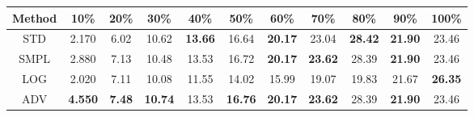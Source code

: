 \documentclass{standalone}
\begin{document}
\begin{tabular}{c|cccccccccc}
      \toprule
      Method & 10\% & 20\% & 30\% & 40\% & 50\% & 60\% & 70\% & 80\% & 90\% & 100\% \\
      \midrule
STD & 2.170 & 6.02 & 10.62 & \textbf{13.66} & 16.64 & \textbf{20.17} & 23.04 & \textbf{28.42} & \textbf{21.90} & 23.46\\
SMPL & 2.880 & 7.13 & 10.48 & 13.53 & 16.72 & \textbf{20.17} & \textbf{23.62} & 28.39 & \textbf{21.90} & 23.46\\
LOG & 2.020 & 7.11 & 10.08 & 11.55 & 14.02 & 15.99 & 19.07 & 19.83 & 21.67 & \textbf{26.35}\\
ADV & \textbf{4.550} & \textbf{7.48} & \textbf{10.74} & 13.53 & \textbf{16.76} & \textbf{20.17} & \textbf{23.62} & 28.39 & \textbf{21.90} & 23.46\\
  \bottomrule
\end{tabular}
\end{document}
